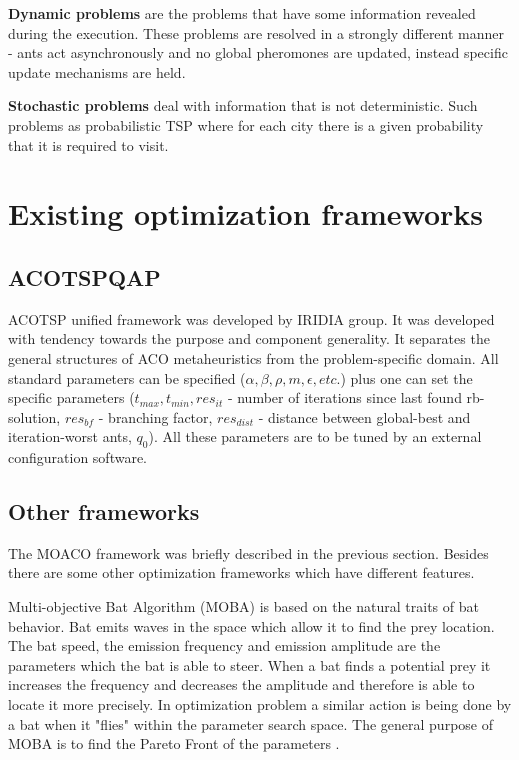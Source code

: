 \documentclass[12pt]{article}
\begin{document}
\textbf{Dynamic problems} are the problems that have some information revealed during the execution. These problems are resolved in a strongly different manner - ants act asynchronously and no global pheromones are updated, instead specific update mechanisms are held.

\textbf{Stochastic problems} deal with information that is not deterministic. Such problems as probabilistic TSP where for each city there is a given probability that it is required to visit.






\section{Existing optimization frameworks}

\subsection{ACOTSPQAP}

ACOTSP unified framework was developed by IRIDIA group. It was developed with tendency towards the purpose and component generality. It separates the general structures of ACO metaheuristics from the problem-specific domain. All standard parameters can be specified ($\alpha, \beta, \rho, m, \epsilon, etc.$) plus one can set the specific parameters ($t_{max}, t_{min}, res_{it}$ - number of iterations since last found rb-solution, $res_{bf}$ - branching factor, $res_{dist}$ - distance between global-best and iteration-worst ants, $q_0$). All these parameters are to be tuned by an external configuration software.

\subsection{Other frameworks}

The MOACO framework was briefly described in the previous section. Besides there are some other optimization frameworks which have different features.

Multi-objective Bat Algorithm (MOBA) is based on the natural traits of bat behavior. Bat emits waves in the space which allow it to find the prey location. The bat speed, the emission  frequency and emission amplitude are the parameters which the bat is able to steer. When a bat finds a potential prey it increases the frequency and decreases the amplitude and therefore is able to locate it more precisely. In optimization problem a similar action is being done by a bat when it "flies" within the parameter search space. The general purpose of MOBA is to find the Pareto Front of the parameters \cite{moba}.
\end{document}
